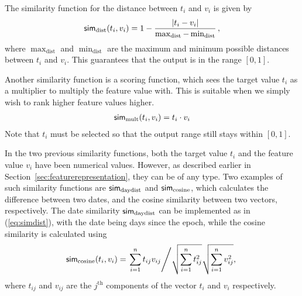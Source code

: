 {The similarity function for the distance between $t_i$ and $v_i$ is given by
\begin{align}
\mathsf{sim}_\text{dist}(t_i, v_i) = 1 - \frac{|t_i - v_i|}{\max_\text{dist} - \min_\text{dist}} \,, \label{eq:simdist}
\end{align}
where $\max_\text{dist}$ and $\min_\text{dist}$ are the maximum and minimum possible distances between $t_i$ and $v_i$.
This guarantees that the output is in the range $[0,1]$.

Another similarity function is a scoring function, which sees the target value $t_i$ as a multiplier to multiply the feature value with. This is suitable when we simply wish to rank higher feature values higher.
\begin{align}
\mathsf{sim}_\text{mult}(t_i, v_i) = t_i \cdot v_i
\end{align}
Note that $t_i$ must be selected so that the output range still stays within $[0,1]$.

In the two previous similarity functions, both the target value $t_i$ and the feature value $v_i$ have been numerical values.
However, as described earlier in Section~\ref{sec:featurerepresentation}, they can be of any type.
Two examples of such similarity functions are $\mathsf{sim}_\text{daydist}$ and $\mathsf{sim}_\text{cosine}$, which calculates the difference between two dates, and the cosine similarity between two vectors, respectively.
The date similarity $\mathsf{sim}_\text{daydist}$ can be implemented as in (\ref{eq:simdist}), with the date being days since the epoch, while
the cosine similarity is calculated using%
\begin{align}
\mathsf{sim}_\text{cosine}(t_i, v_i) = \left. \sum\limits_{i=1}^{n}{t_{ij} v_{ij}} \middle/   \sqrt{\sum\limits_{i=1}^{n}{t_{ij}^2}} \sqrt{\sum\limits_{i=1}^{n}{v_{ij}^2}}, \right.
\end{align}
where $t_{ij}$ and $v_{ij}$ are the $j^{\text{th}}$ components of the vector $t_i$ and $v_i$ respectively.

}

